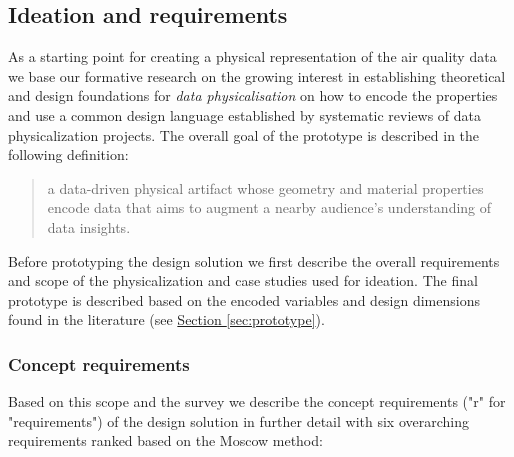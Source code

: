 \subsection{Ideation and requirements}
\label{sec:ideation}

As a starting point for creating a physical representation of the air quality data we base our formative research on the growing interest in establishing theoretical and design foundations for \textit{data physicalisation} \cite{hornecker_design_2023, sauve_physecology_2022, bae_making_2022} on how to encode the properties and use a common design language \cite{ranasinghe_encoding_2023, sosa_data_2018} established by systematic reviews of data physicalization projects. The overall goal of the prototype is described in the following definition:

\begin{quote}
a data-driven physical artifact whose geometry and material properties encode data that aims to augment a nearby audience’s understanding of data insights.
\end{quote}

Before prototyping the design solution we first describe the overall requirements and scope of the physicalization and case studies used for ideation. The final prototype is described based on the encoded variables and design dimensions found in the literature (see \hyperref[sec:prototype]{Section \ref*{sec:prototype}}).

\subsubsection{Concept requirements}

Based on this scope and the survey we describe the concept requirements ("r" for "requirements") of the design solution in further detail with six overarching requirements ranked based on the Moscow method:

